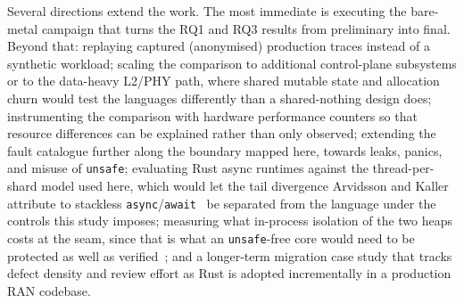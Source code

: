\documentclass[english,twoside,openright,a4paper,censored,csm,software-track-2020]{HYthesisML}
\begin{document}
Several directions extend the work. The most immediate is executing the bare-metal campaign
that turns the RQ1 and RQ3 results from preliminary into final. Beyond that: replaying captured
(anonymised) production traces instead of a synthetic workload; scaling the comparison to
additional control-plane subsystems or to the data-heavy L2/PHY path, where shared mutable
state and allocation churn would test the languages differently than a shared-nothing design
does; instrumenting the comparison with hardware performance counters so that resource
differences can be explained rather than only observed; extending the fault catalogue further
along the boundary mapped here, towards leaks, panics, and misuse of \texttt{unsafe};
evaluating Rust async runtimes against the thread-per-shard model used here, which would let
the tail divergence Arvidsson and Kaller attribute to stackless
\texttt{async}/\texttt{await}~\cite{arvidsson2025async} be separated from the language under
the controls this study imposes; measuring what in-process isolation of the two heaps costs at
the seam, since that is what an \texttt{unsafe}-free core would need to be protected as well as
verified~\cite{rivera2021galeed,kirth2022pkrusafe}; and a longer-term
migration case study that tracks defect density and review effort as Rust is adopted
incrementally in a production RAN codebase.


\cleardoublepage %

\printbibliography
\end{document}
